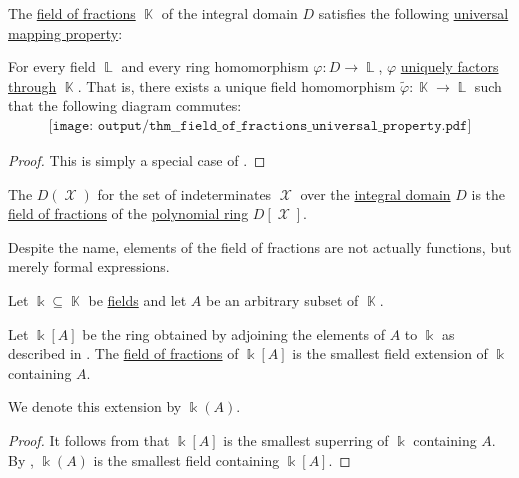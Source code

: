 \begin{proposition}\label{thm:field_of_fractions_universal_property}
  The \hyperref[def:field_of_fractions]{field of fractions} \( \BbbK \) of the integral domain \( D \) satisfies the following \hyperref[rem:universal_mapping_property]{universal mapping property}:
  \begin{displayquote}
    For every field \( \BbbL \) and every ring homomorphism \( \varphi: D \to \BbbL \), \( \varphi \) \hyperref[def:factors_through]{uniquely factors through} \( \BbbK \). That is, there exists a unique field homomorphism \( \widetilde{\varphi}: \BbbK \to \BbbL \) such that the following diagram commutes:
    \begin{equation}\label{eq:thm:field_of_fractions_universal_property/diagram}
      \begin{aligned}
        \texttt{[image: output/thm\_\_field\_of\_fractions\_universal\_property.pdf]}
      \end{aligned}
    \end{equation}
  \end{displayquote}
\end{proposition}
\begin{proof}
  This is simply a special case of .
\end{proof}

\begin{definition}\label{def:rational_function_field}
  The  \( D(\mscrX) \) for the set of indeterminates \( \mscrX \) over the \hyperref[def:integral_domain]{integral domain} \( D \) is the \hyperref[thm:field_of_fractions]{field of fractions} of the \hyperref[def:polynomial_semiring]{polynomial ring} \( D[\mscrX] \).

  Despite the name, elements of the field of fractions are not actually functions, but merely formal expressions.
\end{definition}

\begin{proposition}\label{thm:adjoining_elements_to_field}
  Let \( \Bbbk \subseteq \BbbK \) be \hyperref[def:field]{fields} and let \( A \) be an arbitrary subset of \( \BbbK \).

  Let \( \Bbbk[A] \) be the ring obtained by adjoining the elements of \( A \) to \( \Bbbk \) as described in . The \hyperref[def:field_of_fractions]{field of fractions} of \( \Bbbk[A] \) is the smallest field extension of \( \Bbbk \) containing \( A \).

  We denote this extension by \( \Bbbk(A) \).
\end{proposition}
\begin{proof}
  It follows from  that \( \Bbbk[A] \) is the smallest superring of \( \Bbbk \) containing \( A \). By , \( \Bbbk(A) \) is the smallest field containing \( \Bbbk[A] \).
\end{proof}

